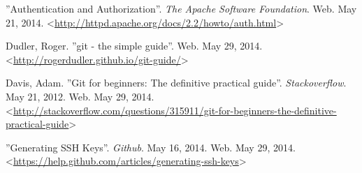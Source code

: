  ''Authentication and Authorization''. \textit{The
Apache Software Foundation}. Web. May 21, 2014.
<\url{http://httpd.apache.org/docs/2.2/howto/auth.html}>

 Dudler, Roger. ''git - the simple guide''. Web. May 29, 2014. 
<\url{http://rogerdudler.github.io/git-guide/}>

 Davis, Adam. ''Git for beginners: The definitive
practical guide''. \textit{Stackoverflow}. May 21, 2012. Web. May 29, 2014.
<\url{http://stackoverflow.com/questions/315911/git-for-beginners-the-definitive-practical-guide}>

 ''Generating SSH Keys''. \textit{Github}.  May 16, 2014. Web. May 29,
2014. <\url{https://help.github.com/articles/generating-ssh-keys}>